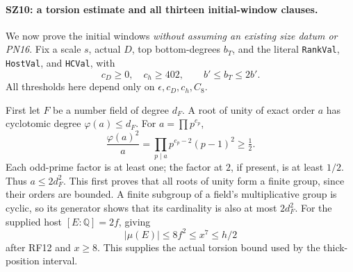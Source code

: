 \documentclass[11pt,a4paper]{article}
\numberwithin{equation}{section}
\theoremstyle{remark}\newtheorem{remark}[theorem]{Remark}
\begin{document}
\paragraph{SZ10: a torsion estimate and all thirteen initial-window clauses.}
We now prove the initial windows \emph{without assuming an existing
size datum or PN16}. Fix a scale $s$, actual $D$, top bottom-degrees
$b_T$, and the literal \texttt{RankVal}, \texttt{HostVal}, and
\texttt{HCVal}, with
\[
 c_D\geq0,\quad c_h\geq402,\qquad
                  b'\leq b_T\leq2b'.                         \tag{SZ.17}
\]
All thresholds here depend only on $\epsilon,c_D,c_h,C_8$.

First let $F$ be a number field of degree $d_F$. A root of unity
of exact order $a$ has cyclotomic degree $\varphi(a)\leq d_F$.
For $a=\prod p^{e_p}$,
\[
  \frac{\varphi(a)^2}{a}
          =\prod_{p\mid a}p^{e_p-2}(p-1)^2\geq\tfrac12.
                                                                    \tag{SZ.18}
\]
Each odd-prime factor is at least one; the factor at $2$, if present,
is at least $1/2$. Thus $a\leq2d_F^2$. This first proves that all
roots of unity form a finite group, since their orders are bounded.
A finite subgroup of a field's multiplicative group is cyclic, so its
generator shows that its cardinality is also at most $2d_F^2$.
For the supplied host $[E:\mathbb Q]=2f$, giving
\[
             |\mu(E)|\leq8f^2\leq x^7\leq h/2             \tag{SZ.19}
\]
after RF12 and $x\geq8$. This supplies the actual torsion bound used
by the thick-position interval.
\end{document}
